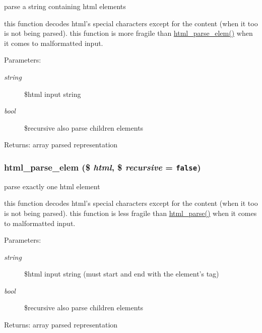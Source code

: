 parse a string containing html elements

this function decodes html's special characters except for the content (when it too is not being parsed). this function is more fragile than \hyperlink{html__parse_8inc_8php_6d9c21ee610953fb5b5b64fae3f74ed3}{html\_\-parse\_\-elem()} when it comes to malformatted input. \begin{Desc}
\item[Parameters:]
\begin{description}
\item[{\em string}]\$html input string \item[{\em bool}]\$recursive also parse children elements \end{description}
\end{Desc}
\begin{Desc}
\item[Returns:]array parsed representation \end{Desc}
\hypertarget{html__parse_8inc_8php_6d9c21ee610953fb5b5b64fae3f74ed3}{
\subsubsection[{html\_\-parse\_\-elem}]{\setlength{\rightskip}{0pt plus 5cm}html\_\-parse\_\-elem (\$ {\em html}, \/  \$ {\em recursive} = {\tt false})}}
\label{html__parse_8inc_8php_6d9c21ee610953fb5b5b64fae3f74ed3}


parse exactly one html element

this function decodes html's special characters except for the content (when it too is not being parsed). this function is less fragile than \hyperlink{html__parse_8inc_8php_1003b146f08aef5a3a78d75a3538a4d7}{html\_\-parse()} when it comes to malformatted input. \begin{Desc}
\item[Parameters:]
\begin{description}
\item[{\em string}]\$html input string (must start and end with the element's tag) \item[{\em bool}]\$recursive also parse children elements \end{description}
\end{Desc}
\begin{Desc}
\item[Returns:]array parsed representation \end{Desc}
